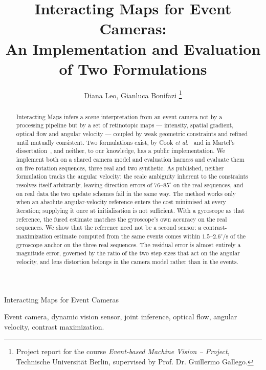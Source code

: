 \documentclass[journal]{IEEEtran}
\begin{document}
\title{Interacting Maps for Event Cameras:\\
An Implementation and Evaluation of Two Formulations}

\author{Diana Leo, Gianluca Bonifazi%
\thanks{Project report for the course \emph{Event-based Machine Vision -- Project},
Technische Universit\"at Berlin, supervised by Prof. Dr. Guillermo Gallego.}}

%
{Interacting Maps for Event Cameras}

\maketitle

\begin{abstract}
Interacting Maps infers a scene interpretation from an event camera not by a
processing pipeline but by a set of retinotopic maps --- intensity, spatial
gradient, optical flow and angular velocity --- coupled by weak geometric
constraints and refined until mutually consistent. Two formulations exist, by
Cook \emph{et al.}~\cite{cook2011,martel2015relational} and in Martel's dissertation~\cite{martel2019thesis}, and neither, to our knowledge,
has a public implementation. We implement both on a shared camera model and
evaluation harness and evaluate them on five rotation sequences, three real and
two synthetic. As published, neither formulation tracks the angular velocity:
the scale ambiguity inherent to the constraints resolves itself arbitrarily,
leaving direction errors of $76$--$85^\circ$ on the real sequences, and on real
data the two update schemes fail in the same way. The method works only when an
absolute angular-velocity reference enters the cost minimised at every
iteration; supplying it once at initialisation is not sufficient. With a
gyroscope as that reference, the fused estimate matches the gyroscope's own
accuracy on the real sequences. We show that the reference need not be a second
sensor: a contrast-maximization estimate computed from the same events comes
within $1.5$--$2.6^\circ$/s of the gyroscope anchor on the three real
sequences. The residual error is almost entirely a magnitude error, governed by
the ratio of the two step sizes that act on the angular velocity, and lens
distortion belongs in the camera model rather than in the events.
\end{abstract}

\begin{IEEEkeywords}
Event camera, dynamic vision sensor, joint inference, optical flow, angular velocity, contrast maximization.
\end{IEEEkeywords}
\end{document}
